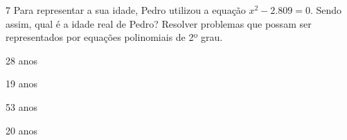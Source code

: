 









\num{7} Para representar a sua idade, Pedro utilizou a equação $x^2 - 2.809 =
0$. Sendo assim, qual é a idade real de Pedro? Resolver problemas que
possam ser representados por equações polinomiais de 2º grau.

\begin{escolha}
\item 28 anos
\item 19 anos
\item 53 anos
\item 20 anos
\end{escolha}











